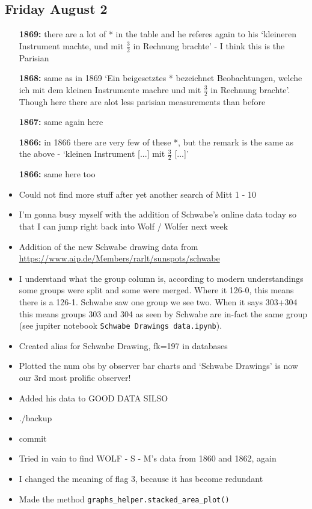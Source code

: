 \documentclass[12pt]{article}
\begin{document}
\subsection{Friday August 2}
\begin{itemize}
    \item[\textbf{1869:}] there are a lot of * in the table and he referes again to his `kleineren Instrument machte, und mit $\frac{3}{2}$ in Rechnung brachte' - I think this is the Parisian
    \item[\textbf{1868:}] same as in 1869 `Ein beigesetztes * bezeichnet Beobachtungen, welche ich mit dem kleinen Instrumente machre und mit $\frac{3}{2}$ in Rechnung brachte'. Though here there are alot less parisian measurements than before
    \item[\textbf{1867:}] same again here
    \item[\textbf{1866:}] in 1866 there are very few of these *, but the remark is the same as the above - `kleinen Instrument [...] mit $\frac{3}{2}$ [...]'
    \item[\textbf{1866:}] same here too
    \item Could not find more stuff after yet another search of Mitt 1 - 10
    
    \item I'm gonna busy myself with the addition of Schwabe's online data today so that I can jump right back into Wolf / Wolfer next week
    \item Addition of the new Schwabe drawing data from \href{https://www.aip.de/Members/rarlt/sunspots/schwabe}{https://www.aip.de/Members/rarlt/sunspots/schwabe}
    
    \item I understand what the group column is, according to modern understandings some groups were split and some were merged. Where it 126-0, this means there is a 126-1. Schwabe saw one group we see two. When it says 303+304 this means groups 303 and 304 as seen by Schwabe are in-fact the same group (see jupiter notebook \texttt{Schwabe Drawings data.ipynb}).
    \item Created alias for Schwabe Drawing, fk=197 in databases
    \item Plotted the num obs by observer bar charts and `Schwabe Drawings' is now our 3rd most prolific observer!
    \item Added his data to GOOD DATA SILSO
    \item ./backup
    \item commit
    \item Tried in vain to find WOLF - S - M's data from 1860 and 1862, again 
    \item I changed the meaning of flag 3, because it has become redundant
    \item Made the method \texttt{graphs\_helper.stacked\_area\_plot()}
\end{itemize}
\end{document}
